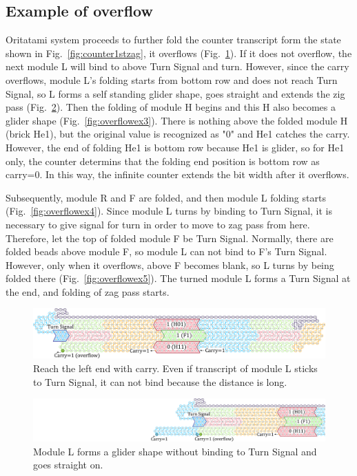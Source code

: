 \documentclass[runningheads]{llncs}
\begin{document}
\subsection{Example of overflow}
Oritatami system proceeds to further fold the counter transcript form the state shown in Fig.~\ref{fig:counter1stzag}, it overflows (Fig.~\ref{fig:overflowex1}).
If it does not overflow, the next module L will bind to above Turn Signal and turn.
However, since the carry overflows, module L's folding starts from bottom row and does not reach Turn Signal, so L forms a self standing glider shape, goes straight and extends the zig pass (Fig.~\ref{fig:overflowex2}).
Then the folding of module H begins and this H also becomes a glider shape (Fig.~\ref{fig:overflowex3}).
There is nothing above the folded module H (brick He1), but the original value is recognized as "0" and He1 catches the carry.
However, the end of folding He1 is bottom row because He1 is glider, so for He1 only, the counter determins that the folding end position is bottom row as carry=0.
In this way, the infinite counter extends the bit width after it overflows.

Subsequently, module R and F are folded, and then module L folding starts (Fig.~\ref{fig:overflowex4}).
Since module L turns by binding to Turn Signal, it is necessary to give signal for turn in order to move to zag pass from here.
Therefore, let the top of folded module F be Turn Signal.
Normally, there are folded beads above module F, so module L can not bind to F's Turn Signal.
However, only when it overflows, above F becomes blank, so L turns by being folded there (Fig.~\ref{fig:overflowex5}).
The turned module L forms a Turn Signal at the end, and folding of zag pass starts.
\begin{figure}[tb]
\centering
\includegraphics[width=\linewidth]{fig/svg/CounterEx13_1.pdf}
\caption{
Reach the left end with carry.
Even if transcript of module L sticks to Turn Signal, it can not bind because the distance is long.
}
\label{fig:overflowex1}
\end{figure}

\begin{figure}[tb]
\centering
\includegraphics[width=\linewidth]{fig/svg/CounterEx14_1.pdf}
\caption{
Module L forms a glider shape without binding to Turn Signal and goes straight on. 
}
\label{fig:overflowex2}
\end{figure}
\end{document}

